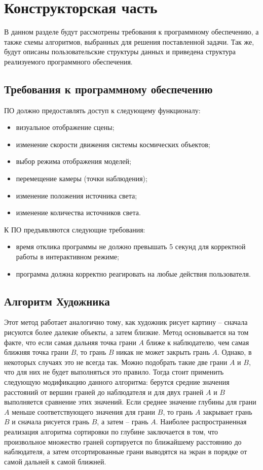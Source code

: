 \chapter{Конструкторская часть}

В данном разделе будут рассмотрены требования к программному обеспечению, а также схемы алгоритмов, выбранных для решения поставленной задачи. Так же, будут описаны пользовательские структуры данных и приведена структура реализуемого программного обеспечения.

\section{Требования к программному обеспечению}

ПО должно предоставлять доступ к следующему функционалу:

\begin{itemize}
    \item визуальное отображение сцены;
    \item изменение скорости движения системы космических объектов;
    \item выбор режима отображения моделей;
    \item перемещение камеры (точки наблюдения);
    \item изменение положения источника света;
    \item изменение количества источников света.
\end{itemize}

К ПО предъявляются следующие требования:

\begin{itemize}
    \item время отклика программы не должно превышать 5 секунд для корректной работы в интерактивном режиме;
    \item программа должна корректно реагировать на любые действия пользователя.
\end{itemize}


\section{Алгоритм Художника}
Этот метод работает аналогично тому, как художник рисует картину -- сначала рисуются более далекие объекты, а затем близкие. Метод основывается на том факте, что если самая дальняя точка грани $A$ ближе к наблюдателю, чем самая ближняя точка грани $B$, то грань $B$ никак не может закрыть грань $A$. Однако, в некоторых случаях это не всегда так. Можно подобрать такие две грани $A$ и $B$, что для них не будет выполняться это правило. Тогда стоит применить следующую модификацию данного алгоритма: берутся средние значения расстояний от вершин граней до наблюдателя и для двух граней $A$ и $B$ выполняется сравнение этих значений. Если среднее значение глубины для грани $A$ меньше соответствующего значения для грани $B$, то грань $A$ закрывает грань $B$ и сначала рисуется грань $B$, а затем -- грань $A$. Наиболее распространенная реализация алгоритма сортировки по глубине заключается в том, что произвольное множество граней сортируется по ближайшему расстоянию до наблюдателя, а затем отсортированные грани выводятся на экран в порядке от самой дальней к самой ближней. 

